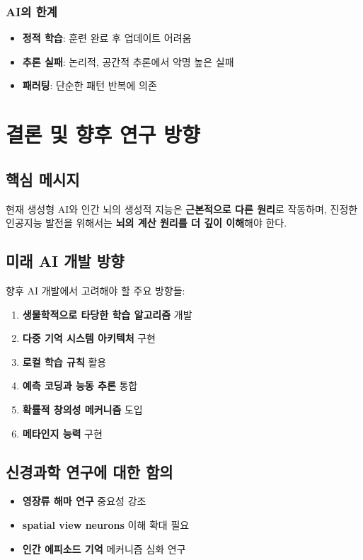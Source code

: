\documentclass[openany]{book}
\begin{document}
\begin{appendices}
\subsubsection{AI의 한계}
\begin{itemize}
\item \textbf{정적 학습}: 훈련 완료 후 업데이트 어려움
\item \textbf{추론 실패}: 논리적, 공간적 추론에서 악명 높은 실패
\item \textbf{패러팅}: 단순한 패턴 반복에 의존
\end{itemize}

\section{결론 및 향후 연구 방향}

\subsection{핵심 메시지}
현재 생성형 AI와 인간 뇌의 생성적 지능은 \textbf{근본적으로 다른 원리}로 작동하며, 진정한 인공지능 발전을 위해서는 \textbf{뇌의 계산 원리를 더 깊이 이해}해야 한다.

\subsection{미래 AI 개발 방향}
향후 AI 개발에서 고려해야 할 주요 방향들:

\begin{enumerate}
\item \textbf{생물학적으로 타당한 학습 알고리즘} 개발
\item \textbf{다중 기억 시스템 아키텍처} 구현
\item \textbf{로컬 학습 규칙} 활용
\item \textbf{예측 코딩과 능동 추론} 통합
\item \textbf{확률적 창의성 메커니즘} 도입
\item \textbf{메타인지 능력} 구현
\end{enumerate}

\subsection{신경과학 연구에 대한 함의}
\begin{itemize}
\item \textbf{영장류 해마 연구} 중요성 강조
\item \textbf{spatial view neurons} 이해 확대 필요
\item \textbf{인간 에피소드 기억} 메커니즘 심화 연구
\end{itemize}



\end{appendices}


% 
% 

\end{document}
